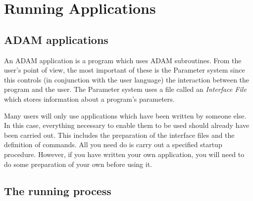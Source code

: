 \chapter{Running Applications}
\label{C_runap}

\section{ADAM applications}
\label{S_aa}

An ADAM application is a program which uses ADAM subroutines.
From the user's point of view, the most important of these is the Parameter
system since this controls (in conjunction with the user language) the
interaction between the program and the user.
The Parameter system uses a file called an {\em Interface File} which stores
information about a program's parameters.

Many users will only use applications which have been written by someone else.
In this case, everything necessary to enable them to be used should already
have been carried out.
This includes the preparation of the interface files and the definition of
commands.
All you need do is carry out a specified startup procedure.
However, if you have written your own application, you will need to do
some preparation of your own before using it.

\section{The running process}
\label{S_runpro}

